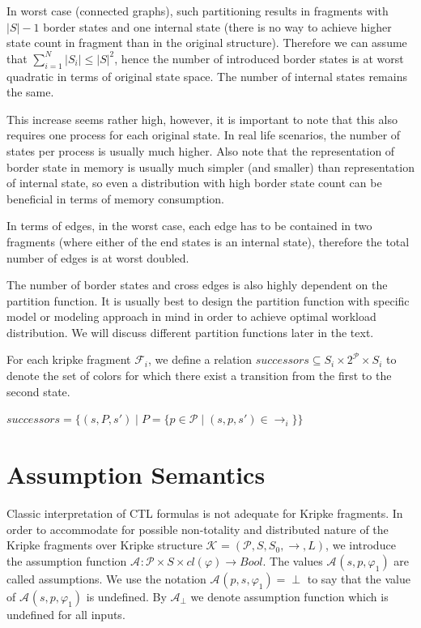 \documentclass[12pt,oneside,draft]{fithesis2}
\newcommand{\as}[1][]{\ensuremath{\mathcal{A}_{#1}}}
\newcommand{\asemt}{\as[\perp]}
\newcommand{\ks}[1][]{\ensuremath{\mathcal{K}_{#1}}}
\newcommand{\kf}[2]{\ensuremath{\mathcal{F}^{#2}_{#1}}}
\newcommand{\fullKs}{\ensuremath{ \ks = (\params, S, S_0, \trans{}, L) }}
\newcommand{\trans}[1]{\stackrel{#1}{\rightarrow}}
\newcommand{\params}{\mathcal{P}}
\begin{document}
			In worst case (connected graphs), such partitioning results in fragments with $|S| - 1$ border states and one internal state (there is no way to achieve higher state count in fragment than in the original structure). Therefore we can assume that $\sum\limits_{i=1}^N | S_i | \leq |S|^2 $, hence the number of introduced border states is at worst quadratic in terms of original state space. The number of internal states remains the same.

			This increase seems rather high, however, it is important to note that this also requires one process for each original state. In real life scenarios, the number of states per process is usually much higher. Also note that the representation of border state in memory is usually much simpler (and smaller) than representation of internal state, so even a distribution with high border state count can be beneficial in terms of memory consumption. 
						
			In terms of edges, in the worst case, each edge has to be contained in two fragments (where either of the end states is an internal state), therefore the total number of edges is at worst doubled.			
			
			The number of border states and cross edges is also highly dependent on the partition function. It is usually best to design the partition function with specific model or modeling approach in mind in order to achieve optimal workload distribution. We will discuss different partition functions later in the text. 
			
			For each kripke fragment $\kf{i}{}$, we define a relation $successors \subseteq S_{i} \times 2^\params \times S_{i} $ to denote the set of colors for which there exist a transition from the first to the second state.
			
			\begin{center}
				$successors = \{(s, P, s') \mid P = \{p \in \params \mid (s, p, s') \in \trans{}_{i} \}\} $
			\end{center}
			
		\section{Assumption Semantics}
		
			Classic interpretation of CTL formulas is not adequate for Kripke fragments. In order to accommodate for possible non-totality and distributed nature of the Kripke fragments over Kripke structure $\fullKs$, we introduce the assumption function $\as : \params \times S \times cl(\varphi) \rightarrow Bool $. The values $\as(s, p, \varphi_1)$ are called assumptions. We use the notation $\as(p, s, \varphi_1) = \perp $ to say that the value of $\as(s, p, \varphi_1)$ is undefined. By $\asemt$ we denote assumption function which is undefined for all inputs.
			
\end{document}
